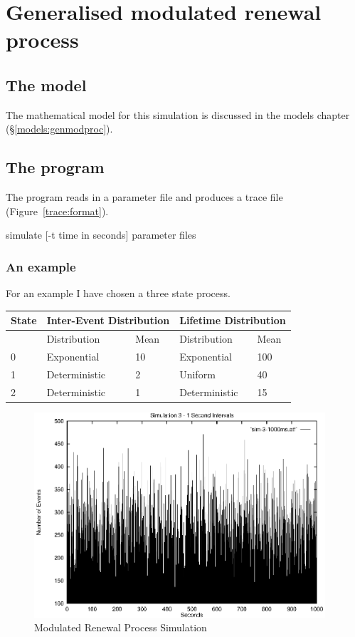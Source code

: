 \section{Generalised modulated renewal process}

\subsection{The model}

The mathematical model for this simulation is discussed in the models
chapter (\S \ref{models:genmodproc}).

\subsection{The program}

The program reads in a parameter file and produces a trace file
(Figure~\ref{trace:format}).

{\ttfamily \begin{flushleft}
  simulate [-t time in seconds] parameter files
\end{flushleft}}

\subsubsection{An example}

For an example I have chosen a three state process.

\bigskip

\begin{tabular}{||l||l|l||l|l||} \hline
State & \multicolumn{2}{l||}{Inter-Event Distribution} &
\multicolumn{2}{l||}{Lifetime Distribution} \\ \hline
 & Distribution & Mean & Distribution & Mean \\ \hline \hline
0 & Exponential & 10 & Exponential & 100 \\ \hline
1 & Deterministic & 2 & Uniform & 40 \\ \hline
2 & Deterministic & 1 & Deterministic & 15 \\ \hline
\end{tabular}

\bigskip

\begin{figure}
\includegraphics[height=3in]{pics/sim-3-1s-freq.eps}
\caption{Modulated Renewal Process Simulation}
\label{simulation:sim3.1s.freq}
\end{figure}

